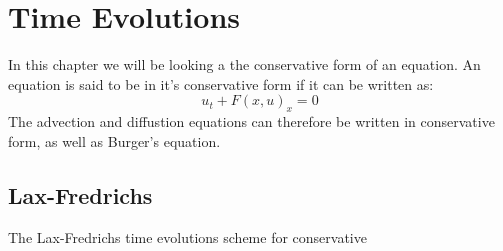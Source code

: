 \chapter{Time Evolutions}
In this chapter we will be looking a the conservative form of an equation. An equation is said to be in it's conservative form if it can be written as:
\begin{equation}
  u_t + F(x,u)_x = 0
\end{equation}
The advection and diffustion equations can therefore be written in conservative form, as well as Burger's equation.
\section{Lax-Fredrichs}
The Lax-Fredrichs time evolutions scheme for conservative 